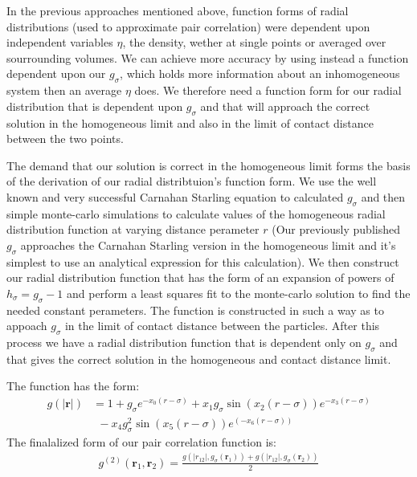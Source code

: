 \documentclass[letterpaper,twocolumn,amsmath,amssymb,pre]{revtex4-1}
\newcommand{\rr}{\textbf{r}}
\begin{document}
In the previous approaches mentioned above, function forms of radial
distributions (used to approximate pair correlation) were dependent
upon independent variables $\eta$, the density, wether at single
points or averaged over sourrounding volumes.  We can achieve more
accuracy by using instead a function dependent upon our $g_{\sigma}$,
which holds more information about an inhomogeneous system
then an average $\eta$ does.  We therefore need a function form for
our radial distribution that is dependent upon $g_{\sigma}$ and that
will approach the correct solution in the homogeneous limit and also
in the limit of contact distance between the two points.

The demand that our solution is correct in the homogeneous limit forms
the basis of the derivation of our radial distribtuion's function
form. We use the well known and very successful Carnahan Starling
equation to calculated $g_{\sigma}$ and then simple monte-carlo
simulations to calculate values of the homogeneous radial distribution
function at varying distance perameter $r$ (Our previously published
$g_{\sigma}$ approaches the Carnahan Starling version in the
homogeneous limit and it's simplest to use an analytical expression
for this calculation).  We then construct our radial distribution
function that has the form of an expansion of powers of $h_{\sigma} =
g_{\sigma}-1$ and perform a least squares fit to the monte-carlo
solution to find the needed constant perameters.  The function is
constructed in such a way as to appoach $g_{\sigma}$ in the limit of
contact distance between the particles.  After this process we have a
radial distribution function that is dependent only on $g_{\sigma}$
and that gives the correct solution in the homogeneous and contact
distance limit.

The function has the form:
\begin{align}
  g(|\rr|) &= 1 + g_{\sigma}e^{-x_0(r-\sigma)} + x_1g_{\sigma}\sin(x_2(r-\sigma))e^{-x_3(r-\sigma)}\\
  &~~-x_4g_{\sigma}^2\sin(x_5(r-\sigma))e^(-x_6(r-\sigma))
\end{align}
The finalalized form of our pair correlation function is:
\begin{align}
  g^{(2)}(\rr_1,\rr_2) = \frac{g(|r_{12}|, g_\sigma(\rr_1)) + g(|r_{12}|, g_\sigma(\rr_2))}{2}
\end{align}



\end{document}
